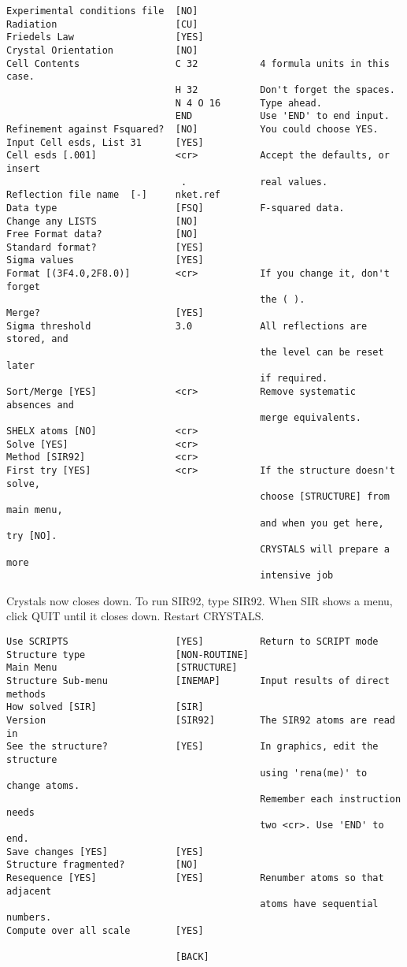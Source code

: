 \documentclass[10pt,a4paper]{report}
\begin{document}
\begin{verbatim}
Experimental conditions file  [NO]
Radiation                     [CU]
Friedels Law                  [YES]
Crystal Orientation           [NO]
Cell Contents                 C 32           4 formula units in this case.
                              H 32           Don't forget the spaces.
                              N 4 O 16       Type ahead.
                              END            Use 'END' to end input.
Refinement against Fsquared?  [NO]           You could choose YES.
Input Cell esds, List 31      [YES]
Cell esds [.001]              <cr>           Accept the defaults, or insert
                               .             real values.
Reflection file name  [-]     nket.ref
Data type                     [FSQ]          F-squared data.
Change any LISTS              [NO]
Free Format data?             [NO]
Standard format?              [YES]
Sigma values                  [YES]
Format [(3F4.0,2F8.0)]        <cr>           If you change it, don't forget
                                             the ( ).
Merge?                        [YES]
Sigma threshold               3.0            All reflections are stored, and
                                             the level can be reset later
                                             if required.
Sort/Merge [YES]              <cr>           Remove systematic absences and
                                             merge equivalents.
SHELX atoms [NO]              <cr>
Solve [YES]                   <cr>
Method [SIR92]                <cr>
First try [YES]               <cr>           If the structure doesn't solve,
                                             choose [STRUCTURE] from main menu,
                                             and when you get here, try [NO].
                                             CRYSTALS will prepare a more
                                             intensive job
\end{verbatim}\normalsize


Crystals now closes down. To run SIR92, type SIR92. When SIR shows a menu,
click QUIT until it closes down. Restart CRYSTALS.
\small\begin{verbatim}
Use SCRIPTS                   [YES]          Return to SCRIPT mode
Structure type                [NON-ROUTINE]
Main Menu                     [STRUCTURE]
Structure Sub-menu            [INEMAP]       Input results of direct methods
How solved [SIR]              [SIR]
Version                       [SIR92]        The SIR92 atoms are read in
See the structure?            [YES]          In graphics, edit the structure
                                             using 'rena(me)' to change atoms.
                                             Remember each instruction needs
                                             two <cr>. Use 'END' to end.
Save changes [YES]            [YES]
Structure fragmented?         [NO]
Resequence [YES]              [YES]          Renumber atoms so that adjacent
                                             atoms have sequential numbers.
Compute over all scale        [YES]

                              [BACK]
\end{verbatim}\normalsize
\end{document}
